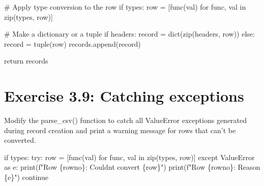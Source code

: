 \documentclass[
  letterpaper,
  DIV=11,
  numbers=noendperiod]{scrreprt}
\newenvironment{Shaded}{\begin{snugshade}}{\end{snugshade}}
\newcommand{\BuiltInTok}[1]{\textcolor[rgb]{0.00,0.46,0.62}{#1}}
\newcommand{\CommentTok}[1]{\textcolor[rgb]{0.37,0.37,0.37}{#1}}
\newcommand{\ControlFlowTok}[1]{\textcolor[rgb]{0.00,0.46,0.62}{#1}}
\newcommand{\ImportTok}[1]{\textcolor[rgb]{0.00,0.46,0.62}{#1}}
\newcommand{\KeywordTok}[1]{\textcolor[rgb]{0.00,0.46,0.62}{#1}}
\newcommand{\NormalTok}[1]{\textcolor[rgb]{0.00,0.46,0.62}{#1}}
\newcommand{\OperatorTok}[1]{\textcolor[rgb]{0.37,0.37,0.37}{#1}}
\newcommand{\PreprocessorTok}[1]{\textcolor[rgb]{0.68,0.00,0.00}{#1}}
\newcommand{\SpecialCharTok}[1]{\textcolor[rgb]{0.37,0.37,0.37}{#1}}
\newcommand{\SpecialStringTok}[1]{\textcolor[rgb]{0.13,0.47,0.30}{#1}}
\begin{document}
\begin{Shaded}
\begin{Highlighting}[]
            \CommentTok{\# Apply type conversion to the row}
            \ControlFlowTok{if}\NormalTok{ types:}
\NormalTok{                row }\OperatorTok{=}\NormalTok{ [func(val) }\ControlFlowTok{for}\NormalTok{ func, val }\KeywordTok{in} \BuiltInTok{zip}\NormalTok{(types, row)]}

            \CommentTok{\# Make a dictionary or a tuple}
            \ControlFlowTok{if}\NormalTok{ headers:}
\NormalTok{                record }\OperatorTok{=} \BuiltInTok{dict}\NormalTok{(}\BuiltInTok{zip}\NormalTok{(headers, row))}
            \ControlFlowTok{else}\NormalTok{:}
\NormalTok{                record }\OperatorTok{=} \BuiltInTok{tuple}\NormalTok{(row)}
\NormalTok{            records.append(record)}

        \ControlFlowTok{return}\NormalTok{ records}
\end{Highlighting}
\end{Shaded}

\hypertarget{exercise-3.9-catching-exceptions}{%
\section{Exercise 3.9: Catching
exceptions}\label{exercise-3.9-catching-exceptions}}

Modify the parse\_csv() function to catch all ValueError exceptions
generated during record creation and print a warning message for rows
that can't be converted.

\begin{Shaded}
\begin{Highlighting}[]
\ControlFlowTok{if}\NormalTok{ types:}
    \ControlFlowTok{try}\NormalTok{:}
\NormalTok{        row }\OperatorTok{=}\NormalTok{ [func(val) }\ControlFlowTok{for}\NormalTok{ func, val }\KeywordTok{in} \BuiltInTok{zip}\NormalTok{(types, row)]}
    \ControlFlowTok{except} \PreprocessorTok{ValueError} \ImportTok{as}\NormalTok{ e:}
        \BuiltInTok{print}\NormalTok{(}\SpecialStringTok{f"Row }\SpecialCharTok{\{}\NormalTok{rowno}\SpecialCharTok{\}}\SpecialStringTok{: Couldn\textquotesingle{}t convert }\SpecialCharTok{\{}\NormalTok{row}\SpecialCharTok{\}}\SpecialStringTok{"}\NormalTok{)}
        \BuiltInTok{print}\NormalTok{(}\SpecialStringTok{f"Row }\SpecialCharTok{\{}\NormalTok{rowno}\SpecialCharTok{\}}\SpecialStringTok{: Reason }\SpecialCharTok{\{}\NormalTok{e}\SpecialCharTok{\}}\SpecialStringTok{"}\NormalTok{)}
    \ControlFlowTok{continue}
\end{Highlighting}
\end{Shaded}
\end{document}
